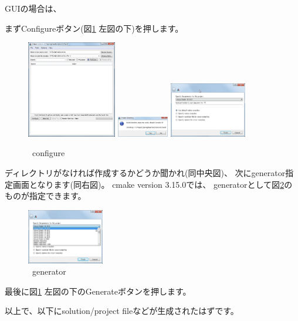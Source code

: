 \medskip
\noindent
GUIの場合は、
\begin{narrow}[15pt]
	まずConfigureボタン(図\ref{fig:CmakeConfigure} 左図の下)を押します。
	\begin{figure}[h]
	\begin{center}
	\includegraphics[width=0.35\textwidth]{fig/CmakeConfigure1.eps}
	\includegraphics[width=0.2\textwidth]{fig/CmakeConfigure2.eps}
	\includegraphics[width=0.3\textwidth]{fig/CmakeConfigure3.eps}
	\end{center}
	\caption{\cmake\ configure}
	\label{fig:CmakeConfigure}
	\end{figure}

	\build ディレクトリがなければ作成するかどうか聞かれ(同中央図)、
	次にgenerator指定画面となります(同右図)。
	cmake version 3.15.0では、
	generatorとして図\ref{fig:CmakeGenerator}のものが指定できます。

	\begin{figure}[h]
	\begin{center}
	\includegraphics[width=0.3\textwidth]{fig/CmakeConfigure4.eps}
	\end{center}
	\caption{\cmake\ generator}
	\label{fig:CmakeGenerator}
	\end{figure}

	最後に図\ref{fig:CmakeConfigure} 左図の下のGenerateボタンを押します。
\end{narrow}

\medskip
\noindent
以上で、\build 以下にsolution/project fileなどが生成されたはずです。

\bigskip

